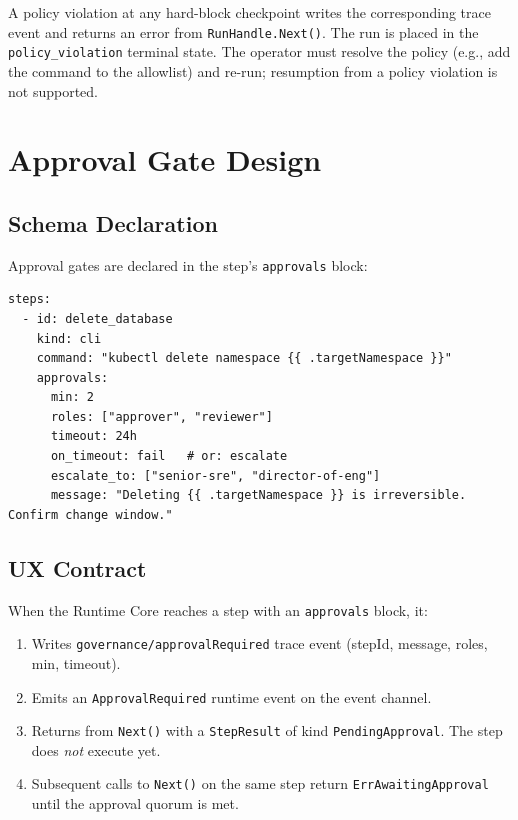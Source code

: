 A policy violation at any hard-block checkpoint writes the corresponding trace event and
returns an error from \texttt{RunHandle.Next()}. The run is placed in the
\texttt{policy\_violation} terminal state. The operator must resolve the policy
(e.g., add the command to the allowlist) and re-run; resumption from a policy violation
is not supported.

\section{Approval Gate Design}
\label{sec:approval-gate}

\subsection{Schema Declaration}

Approval gates are declared in the step's \texttt{approvals} block:

\begin{verbatim}
steps:
  - id: delete_database
    kind: cli
    command: "kubectl delete namespace {{ .targetNamespace }}"
    approvals:
      min: 2
      roles: ["approver", "reviewer"]
      timeout: 24h
      on_timeout: fail   # or: escalate
      escalate_to: ["senior-sre", "director-of-eng"]
      message: "Deleting {{ .targetNamespace }} is irreversible. Confirm change window."
\end{verbatim}

\subsection{UX Contract}

When the Runtime Core reaches a step with an \texttt{approvals} block, it:
\begin{enumerate}
  \item Writes \texttt{governance/approvalRequired} trace event (stepId, message, roles, min, timeout).
  \item Emits an \texttt{ApprovalRequired} runtime event on the event channel.
  \item Returns from \texttt{Next()} with a \texttt{StepResult} of kind \texttt{PendingApproval}.
        The step does \emph{not} execute yet.
  \item Subsequent calls to \texttt{Next()} on the same step return \texttt{ErrAwaitingApproval}
        until the approval quorum is met.
\end{enumerate}

